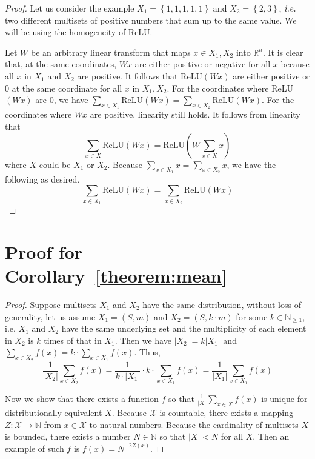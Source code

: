\begin{appendix}
\begin{proof}
Let us consider the example $X_1 = \left\lbrace 1, 1, 1, 1, 1 \right\rbrace$ and $X_2 = \left\lbrace 2, 3 \right\rbrace$, $\textit{i.e.}$ two different multisets of positive numbers that sum up to the same value. We will be using the homogeneity of ReLU. 

Let $W$ be an arbitrary linear transform that maps $x \in X_1, X_2$ into $\mathbb{R}^n$. It is clear that, at the same coordinates, $Wx$ are either positive or negative for all $x$ because all $x$ in $X_1$ and $X_2$ are positive. It follows that ReLU$(Wx)$ are either positive or $0$ at the same coordinate for all $x$ in $X_1, X_2$. For the coordinates where ReLU$(Wx)$ are $0$, we  have $\sum_{x \in X_1} \text{ReLU} \left( Wx \right) = \sum_{x \in X_2} \text{ReLU} \left( Wx \right)$. For the coordinates where $Wx$ are positive, linearity still holds. It follows from linearity that 
\[ \sum_{x \in X} \text{ReLU}\left( Wx \right) = \text{ReLU}\left( W \sum_{x\in X} x\right) \]
where $X$ could be $X_1$ or $X_2$. Because $\sum_{x \in X_1} x = \sum_{x \in X_2} x$, we have the following as desired. \[\sum_{x \in X_1} \text{ReLU} \left( Wx \right) = \sum_{x \in X_2} \text{ReLU} \left( Wx \right) \] 
\end{proof}


\section{Proof for Corollary~\ref{theorem:mean}}


\begin{proof}
Suppose multisets $X_1$ and $X_2$ have the same distribution, without loss of generality, let us assume $X_1 = (S, m)$ and $X_2 = (S, k \cdot m)$ for some $k \in \mathbb{N}_{\geq 1}$, i.e. $X_1$ and $X_2$ have the same underlying set and the multiplicity of each element in $X_2$ is $k$ times of that in $X_1$. Then we have $|X_2| = k |X_1|$ and $\sum_{x \in X_2} f(x) = k \cdot \sum_{x \in X_1} f(x)$. Thus, \[  \frac{1}{|X_2|}  \sum_{x \in X_2} f(x)  =  \frac{1}{k \cdot |X_1|} \cdot k \cdot \sum_{x \in X_1} f(x)  =  \frac{1}{|X_1|}  \sum_{x \in X_1} f(x)  \]

Now we show that there exists a function $f$ so that $\frac{1}{|X|} \sum_{x \in X} f(x)$ is unique for distributionally equivalent $X$. Because $\mathcal{X}$ is countable, there exists a mapping $Z: \mathcal{X} \rightarrow \mathbb{N}$ from $x \in \mathcal{X}$ to natural numbers. Because the cardinality of multisets $X$ is bounded, there exists a number $N \in \mathbb{N}$ so that $|X| < N$ for all $X$.  Then an example of such $f$ is $f(x) =N^{-2 Z(x)}$. 
\end{proof}


\end{appendix}
